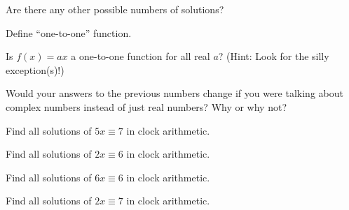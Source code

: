 \documentclass[../gatm_answers.tex]{subfiles}
\begin{document}
\begin{inner_problem}
\item Are there any other possible numbers of solutions?
\end{inner_problem}

\begin{outer_problem}
\item
\end{outer_problem}

\begin{inner_problem}[start=1]
\item Define ``one-to-one'' function.
\end{inner_problem}

\begin{inner_problem}
\item Is $f(x)=ax$ a one-to-one function for all real $a$? (Hint: Look for the silly exception(s)!)
\end{inner_problem}

\begin{outer_problem}
\item Would your answers to the previous numbers change if you were talking about complex numbers instead of just real numbers? Why or why not?
\end{outer_problem}

\begin{outer_problem}
\item
\end{outer_problem}

\begin{inner_problem}[start=1]
\item Find all solutions of $5x\equiv 7$ in clock arithmetic.
\end{inner_problem}

\begin{inner_problem}
\item Find all solutions of $2x\equiv 6$ in clock arithmetic.
\end{inner_problem}

\begin{inner_problem}
\item Find all solutions of $6x\equiv 6$ in clock arithmetic.
\end{inner_problem}

\begin{inner_problem}
\item Find all solutions of $2x\equiv 7$ in clock arithmetic.
\end{inner_problem}
\end{document}
